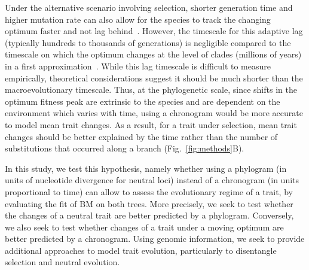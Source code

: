 \documentclass{article}
\begin{document}
Under the alternative scenario involving selection, shorter generation time and higher mutation rate can also allow for the species to track the changing optimum faster and not lag behind~\citep{lande_natural_1976, hansen_comparative_2008}.
However, the timescale for this adaptive lag (typically hundreds to thousands of generations) is negligible compared to the timescale on which the optimum changes at the level of clades (millions of years) in a first approximation~\citep{hansen_three_2024}.
While this lag timescale is difficult to measure empirically, theoretical considerations suggest it should be much shorter than the macroevolutionary timescale.
Thus, at the phylogenetic scale, since shifts in the optimum fitness peak are extrinsic to the species and are dependent on the environment which varies with time, using a chronogram would be more accurate to model mean trait changes.
As a result, for a trait under selection, mean trait changes should be better explained by the time rather than the number of substitutions that occurred along a branch (Fig.~\ref{fig:methods}B).

In this study, we test this hypothesis, namely whether using a phylogram (in units of nucleotide divergence for neutral loci) instead of a chronogram (in units proportional to time) can allow to assess the evolutionary regime of a trait, by evaluating the fit of BM on both trees.
More precisely, we seek to test whether the changes of a neutral trait are better predicted by a phylogram.
Conversely, we also seek to test whether changes of a trait under a moving optimum are better predicted by a chronogram.
Using genomic information, we seek to provide additional approaches to model trait evolution, particularly to disentangle selection and neutral evolution.
\end{document}
